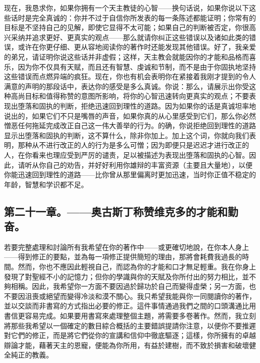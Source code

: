 现在，我恳求你，如果你拥有一个天主教徒的心智——换句话说，如果你说以下这些话时是完全真诚的：你并不过于自信你所发表的每一条陈述都能证明；你常有的目标是不坚持自己的见解，即使它显得不太可能；如果自己的判断被否定，你很高兴采纳并追求更好、更真实的观点——那么就请你纠正这些错误以及诸如此类的错误，或许在你更仔细、更从容地阅读你的著作时还能发现其他错误。好了，我亲爱的弟兄，请证明你说这些话并非虚假；这样，天主教会就能因你的才能和品格而喜乐，因为你不仅具有天赋，而且还有智慧、虔诚和节制，而不是由于你固执地坚持这些错误而点燃异端的疯狂。现在，你也有机会表明你在紧接着我刚才提到的令人满意的声明的那段话中，表达你的感受是多么真诚。你说：那么，请展示出你受这种高尚目标和值得称赞的意图所影响，将你的心智迅速转向更真实的观点；不要表现出堕落和固执的判断，拒绝迅速回到理性的道路。因为如果你的话是真诚坦率地说出的，如果它们不只是嘴唇的声音，如果你真的从心里感受到它们，那么你必然憎恶任何拖延完成改正自己这一伟大善举的行为。的确，你说拒绝回到理性的道路显示出堕落和固执的判断，这不算什么，除非你加上。加上这个词，你就向我们表明，那种从不进行改正的人的行为是多么可憎；因为即便只是迟迟才进行改正的人，在你看来也理应受到严厉的谴责，足以被描述为表现出堕落和固执的心智。因此，请听从你自己的劝告，并好好利用你雄辩的丰富资源（主要且大量地），以便你能迅速回到理性的道路——比你曾从那里偏离时更加迅速，当时你正值不稳定的年龄，智慧和学识都不足。\par


\subsection{第二十一章。——奥古斯丁称赞维克多的才能和勤奋。}

若要完整處理和討論所有我希望在你的著作中——或更確切地說，在你本人身上——得到修正的要點，並為每一項修正提供簡短的理由，那將會耗費我過長的時間。然而，你也不應因此輕視自己，而認為你的才能和口才無足輕重。我在你身上發現了對聖經不小的記憶力；但你的學識與你的天賦及你所付出的努力相比，並不夠相稱。因此，我希望你一方面不要因過於歸功於自己而變得虛榮；另一方面，也不要因沮喪或絕望而變得冷淡和漠不關心。我只希望我能與你一同閱讀你的著作，並以交談而非書寫的方式指出必要的修正。這件事情通過我們之間的口頭溝通比用書信更容易完成。如果要用書寫來處理整個主題，將需要多卷著作。然而，我立刻將那些我希望以一個確定的數目綜合概括的主要錯誤提請你注意，以便你不要推遲對它們的修正，而是將它們從你的宣講和信仰中徹底驅逐；這樣，你所擁有的卓越辯論才能，藉著天主的恩寵，便能為你所用，有益於建樹，而不致於損害和破壞健全純正的教義。\par

